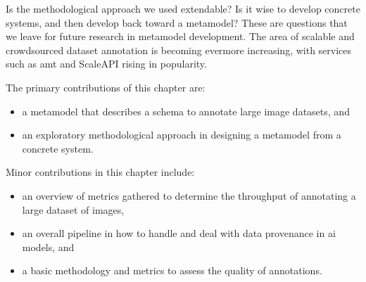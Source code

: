 Is the methodological approach we used extendable? Is it wise to develop concrete systems, and then develop back toward a metamodel? These are questions that we leave for future research in metamodel development. The area of scalable and crowdsourced dataset annotation is becoming evermore increasing, with services such as \gls{amt} and ScaleAPI rising in popularity.

\bigskip

\noindent
The primary contributions of this chapter are:

\begin{itemize}
  \item a metamodel that describes a schema to annotate large image datasets, and
  \item an exploratory methodological approach in designing a metamodel from a concrete system.
\end{itemize}

\noindent
Minor contributions in this chapter include:

\begin{itemize}
  \item an overview of metrics gathered to determine the throughput of annotating a large dataset of images,
  \item an overall pipeline in how to handle and deal with data provenance in \gls{ai} models, and
  \item a basic methodology and metrics to assess the quality of annotations.
\end{itemize}



